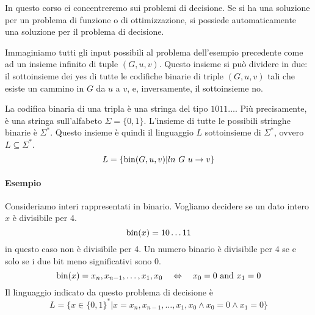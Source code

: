 In questo corso ci concentreremo sui problemi di decisione. Se si ha una soluzione per un problema di funzione o di ottimizzazione, si possiede automaticamente una soluzione per il problema di decisione.\medskip

Immaginiamo tutti gli input possibili al problema dell'esempio precedente come ad un insieme infinito di tuple $(G,u,v)$. Questo insieme si può dividere in due: il sottoinsieme dei yes di tutte le codifiche binarie di triple $(G,u,v)$ tali che esiste un cammino in $G$ da $u$ a $v$, e, inversamente, il sottoinsieme no.
\begin{center}
\end{center}
La codifica binaria di una tripla è una stringa del tipo $1011\dots$. Più precisamente, è una stringa sull'alfabeto $\Sigma=\{0,1\}$. L'insieme di tutte le possibili stringhe binarie è $\Sigma^*$. Questo insieme è quindi il linguaggio $L$ sottoinsieme di $\Sigma^*$, ovvero $L\subseteq\Sigma^*$.
$$
    L = \{ \operatorname*{bin}(G,u,v)|ln~G~u\to v \}
$$

\paragraph{Esempio} Consideriamo interi rappresentati in binario. Vogliamo decidere se un dato intero $x$ è divisibile per 4.
$$
    \operatorname*{bin}(x) = 10\dots11
$$
in questo caso non è divisibile per 4. Un numero binario è divisibile per 4 se e solo se i due bit meno significativi sono 0.
$$
    \operatorname*{bin}(x) = x_n,x_{n-1},\dots,x_1,x_0 \quad \Leftrightarrow \quad x_0 = 0 \text{ and } x_1 = 0
$$
Il linguaggio indicato da questo problema di decisione è
$$
    L = \{ x\in\{0,1\}^* | x=x_n,x_{n-1},\dots,x_1,x_0 \land x_0 = 0 \land x_1 = 0 \}
$$


